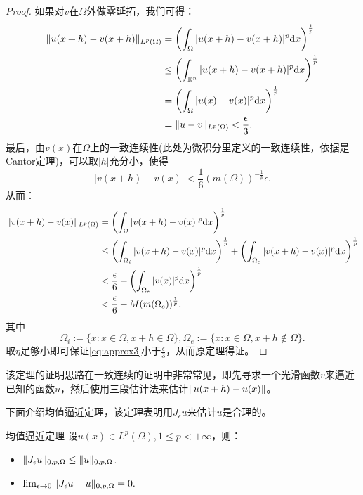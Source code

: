 \begin{proof}
    如果对$v$在$\Omega$外做零延拓，我们可得：
    \begin{equation}
        \begin{aligned}
            \|u(x+h)-v(x+h)\|_{L^{p}(\Omega)}&=\left(\int_{\Omega}|u(x+h)-v(x+h)|^{p}\mathrm{d} x\right)^{\frac{1}{p}}\\
            &\le\left(\int_{\mathbb{R}^{n}}|u(x+h)-v(x+h)|^{p}\mathrm{d} x\right)^{\frac{1}{p}}\\
            &=\left(\int_{\Omega}|u(x)-v(x)|^{p}\mathrm{d} x\right)^{\frac{1}{p}}\\
            &=\|u-v\|_{L^{p}(\Omega)}<\frac{\epsilon}{3}.
        \end{aligned}
    \end{equation}
    最后，由$v(x)$在$\Omega$上的一致连续性(此处为微积分里定义的一致连续性，依据是Cantor定理)，可以取$|h|$充分小，使得
    \begin{equation}
        |v(x+h)-v(x)|<\frac{1}{6}(m(\Omega))^{-\frac{1}{p}}\epsilon.
    \end{equation}
    从而：
    \begin{equation}
        \label{eq:approx3}
        \begin{aligned}
        \|v(x+h)-v(x)\|_{L^{p}(\Omega)}&=\left(\int_{\Omega}|v(x+h)-v(x)|^{p}\mathrm{d} x\right)^{\frac{1}{p}}\\
        &\le\left(\int_{\Omega_{i}}|v(x+h)-v(x)|^{p}\mathrm{d} x\right)^{\frac{1}{p}}+\left(\int_{\Omega_{e}}|v(x+h)-v(x)|^{p}\mathrm{d} x\right)^{\frac{1}{p}}\\
        &<\frac{\epsilon}{6}+\left(\int_{\Omega_{e}}|v(x)|^{p}\mathrm{d} x\right)^{\frac{1}{p}}\\
        &<\frac{\epsilon}{6}+M(m(\Omega_{e}))^{\frac{1}{p}}.
        \end{aligned}
    \end{equation}
    其中
    \begin{equation}
        \Omega_{i}:=\{x:x\in\Omega,x+h\in\Omega\},\Omega_{e}:=\{x:x\in\Omega,x+h\notin\Omega\}.
    \end{equation}
    取$\eta$足够小即可保证\eqref{eq:approx3}小于$\frac{\epsilon}{3}$，从而原定理得证。
\end{proof}
\begin{remark}
    该定理的证明思路在一致连续的证明中非常常见，即先寻求一个光滑函数$v$来逼近已知的函数$u$，然后使用三段估计法来估计$\|u(x+h)-u(x)\|$。
\end{remark}
下面介绍均值逼近定理，该定理表明用$J_{\epsilon}u$来估计$u$是合理的。
\begin{theorem}{均值逼近定理}
    设$u(x)\in L^{p}(\Omega) ,1\le p<+\infty$，则：
    \begin{itemize}
        \item $\|J_{\epsilon}u\|_{0,p,\Omega}\le\|u\|_{0,p,\Omega}$.
        \item $\lim_{\epsilon\rightarrow 0}\|J_{\epsilon}u-u\|_{0,p,\Omega}=0.$
    \end{itemize}
\end{theorem}
